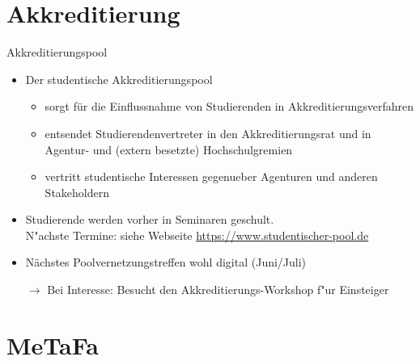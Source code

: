 \documentclass[compress, aspectratio=169]{beamer}
\begin{document}


\section{Akkreditierung}

\begin{frame}{Akkreditierungspool}
    \begin{itemize}
        \item Der studentische Akkreditierungspool
        \begin{itemize}
        	\item sorgt für die Einflussnahme von Studierenden in Akkreditierungsverfahren
        	\item entsendet Studierendenvertreter in den Akkreditierungsrat und in Agentur- und (extern besetzte) Hochschulgremien
        	\item vertritt studentische Interessen gegenueber Agenturen und anderen Stakeholdern
        \end{itemize}         
        \item Studierende werden vorher in Seminaren geschult. \\
          {\scriptsize\color{blue} N"achste Termine: siehe Webseite \url{https://www.studentischer-pool.de}}
        \item Nächstes Poolvernetzungstreffen wohl digital {\color{blue} (Juni/Juli)}
        \vspace{0.5cm}
        \item[$\rightarrow$] Bei Interesse: Besucht den Akkreditierungs-Workshop f"ur Einsteiger
    \end{itemize}
\end{frame}


\section{MeTaFa}
\end{document}
